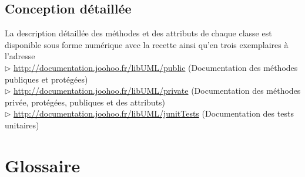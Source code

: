 \documentclass[12pt,a4paper,openany]{report}
\begin{document}
	\section{Conception détaillée}
	La description détaillée des méthodes et des attributs de chaque classe est disponible sous forme numérique
	avec la recette ainsi qu'en trois exemplaires à l'adresse \\
	$\rhd$ \url{http://documentation.joohoo.fr/libUML/public} (Documentation des méthodes publiques et protégées)\\
	$\rhd$ \url{http://documentation.joohoo.fr/libUML/private} (Documentation des méthodes privée, protégées, pu\-bliques et des attributs)\\
	$\rhd$ \url{http://documentation.joohoo.fr/libUML/junitTests} (Documentation des tests unitaires)
	
	\appendix
	\closeout\glossaireVar
	\chapter{Glossaire}\label{glossaire}
	\begin{sortedlist}
		
	\end{sortedlist}
\end{document}

